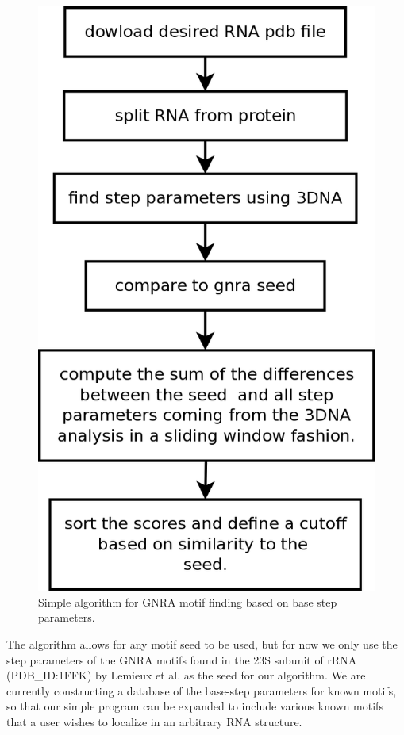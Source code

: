 \begin{figure}[ht]
\centering
\includegraphics[angle=0, scale=0.4]{Chapter5/getMotif.png}
\caption{Simple algorithm  for GNRA motif  finding based on  base step
  parameters.}
\label{fig:getMotif}
\end{figure}
  
The algorithm  allows for any  motif seed to  be used, but for  now we
only  use the  step parameters  of the  GNRA motifs  found in  the 23S
subunit of rRNA (PDB\_ID:1FFK) by Lemieux et al. \cite{lemieux2006} as
the seed for our algorithm.   We are currently constructing a database
of  the base-step  parameters for  known  motifs, so  that our  simple
program can  be expanded to include  various known motifs  that a user
wishes to localize in an arbitrary RNA structure.

